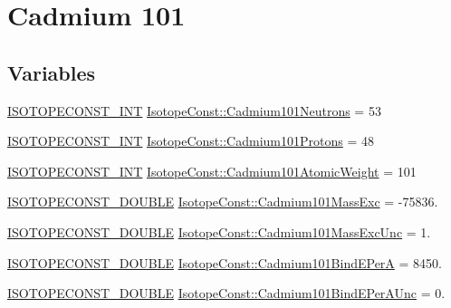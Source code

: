 \hypertarget{group___isotope_const-_cadmium-_cd101}{}\section{Cadmium 101}
\label{group___isotope_const-_cadmium-_cd101}
\subsection*{Variables}
\begin{DoxyCompactItemize}
\item 
\mbox{\hyperlink{group___isotope_const-_macros_ga5f18360b3e99483a35c32d789e62621c}{I\+S\+O\+T\+O\+P\+E\+C\+O\+N\+S\+T\+\_\+\+I\+NT}} \mbox{\hyperlink{group___isotope_const-_cadmium-_cd101_ga0e2be012f824f41121792438157c7887}{Isotope\+Const\+::\+Cadmium101\+Neutrons}} = 53
\item 
\mbox{\hyperlink{group___isotope_const-_macros_ga5f18360b3e99483a35c32d789e62621c}{I\+S\+O\+T\+O\+P\+E\+C\+O\+N\+S\+T\+\_\+\+I\+NT}} \mbox{\hyperlink{group___isotope_const-_cadmium-_cd101_ga14a4682fecda7f9283c5d8509769aa85}{Isotope\+Const\+::\+Cadmium101\+Protons}} = 48
\item 
\mbox{\hyperlink{group___isotope_const-_macros_ga5f18360b3e99483a35c32d789e62621c}{I\+S\+O\+T\+O\+P\+E\+C\+O\+N\+S\+T\+\_\+\+I\+NT}} \mbox{\hyperlink{group___isotope_const-_cadmium-_cd101_ga14f9fbf3a4cd71b32114c00f7f306bbc}{Isotope\+Const\+::\+Cadmium101\+Atomic\+Weight}} = 101
\item 
\mbox{\hyperlink{group___isotope_const-_macros_ga8f45a7272ce02c0b4c65c44636ed719a}{I\+S\+O\+T\+O\+P\+E\+C\+O\+N\+S\+T\+\_\+\+D\+O\+U\+B\+LE}} \mbox{\hyperlink{group___isotope_const-_cadmium-_cd101_ga254ab75c4d303fae86b39a7a3cb23f30}{Isotope\+Const\+::\+Cadmium101\+Mass\+Exc}} = -\/75836.
\item 
\mbox{\hyperlink{group___isotope_const-_macros_ga8f45a7272ce02c0b4c65c44636ed719a}{I\+S\+O\+T\+O\+P\+E\+C\+O\+N\+S\+T\+\_\+\+D\+O\+U\+B\+LE}} \mbox{\hyperlink{group___isotope_const-_cadmium-_cd101_ga9106a425245761f3ba8e58b3391a7364}{Isotope\+Const\+::\+Cadmium101\+Mass\+Exc\+Unc}} = 1.
\item 
\mbox{\hyperlink{group___isotope_const-_macros_ga8f45a7272ce02c0b4c65c44636ed719a}{I\+S\+O\+T\+O\+P\+E\+C\+O\+N\+S\+T\+\_\+\+D\+O\+U\+B\+LE}} \mbox{\hyperlink{group___isotope_const-_cadmium-_cd101_gabccf8c9ec972be872a9fd8fc189f8ea3}{Isotope\+Const\+::\+Cadmium101\+Bind\+E\+PerA}} = 8450.
\item 
\mbox{\hyperlink{group___isotope_const-_macros_ga8f45a7272ce02c0b4c65c44636ed719a}{I\+S\+O\+T\+O\+P\+E\+C\+O\+N\+S\+T\+\_\+\+D\+O\+U\+B\+LE}} \mbox{\hyperlink{group___isotope_const-_cadmium-_cd101_ga8a18c46700f6a1ea6d71e25d78ab8c62}{Isotope\+Const\+::\+Cadmium101\+Bind\+E\+Per\+A\+Unc}} = 0.

\end{DoxyCompactItemize}
